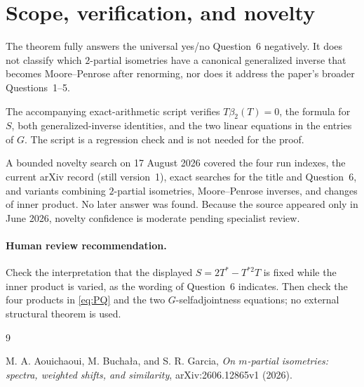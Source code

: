 \documentclass[11pt]{article}
\begin{document}
\section{Scope, verification, and novelty}

The theorem fully answers the universal yes/no Question~6 negatively.  It
does not classify which $2$-partial isometries have a canonical generalized
inverse that becomes Moore--Penrose after renorming, nor does it address the
paper's broader Questions~1--5.

The accompanying exact-arithmetic script verifies $T\beta_2(T)=0$, the formula
for $S$, both generalized-inverse identities, and the two linear equations in
the entries of $G$.  The script is a regression check and is not needed for
the proof.

A bounded novelty search on 17 August 2026 covered the four run indexes, the
current arXiv record (still version~1), exact searches for the title and
Question~6, and variants combining $2$-partial isometries, Moore--Penrose
inverses, and changes of inner product.  No later answer was found.  Because
the source appeared only in June 2026, novelty confidence is moderate pending
specialist review.

\paragraph{Human review recommendation.}
Check the interpretation that the displayed $S=2T^*-T^{*2}T$ is fixed while
the inner product is varied, as the wording of Question~6 indicates.  Then
check the four products in \eqref{eq:PQ} and the two $G$-selfadjointness
equations; no external structural theorem is used.

\begin{thebibliography}{9}
\raggedright
{}
M. A. Aouichaoui, M. Bucha\l a, and S. R. Garcia,
\emph{On $m$-partial isometries: spectra, weighted shifts, and similarity},
arXiv:2606.12865v1 (2026).
\end{thebibliography}
\end{document}
